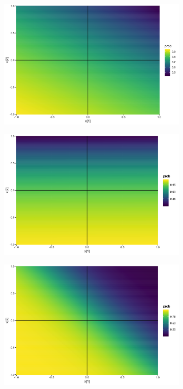 \documentclass[10pt,mathserif]{beamer}
\begin{document}
\begin{frame}
\begin{figure}
\begin{subfigure}{.17\paperwidth}
    \end{subfigure}
    \begin{subfigure}{.17\paperwidth}
      \centering
      \includegraphics[width=0.17\paperwidth]{figure/sigmoid_plot_3}
    \end{subfigure}
    \begin{subfigure}{.17\paperwidth}
      \centering
      \includegraphics[width=0.17\paperwidth]{figure/sigmoid_plot_4}
    \end{subfigure}
    \begin{subfigure}{.17\paperwidth}
      \centering
      \includegraphics[width=0.17\paperwidth]{figure/sigmoid_plot_5}

\end{subfigure}
\end{figure}
\end{frame}
\end{document}

